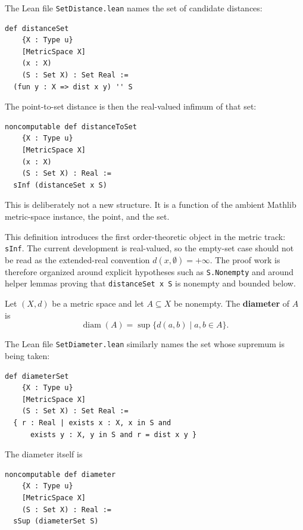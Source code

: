 \begin{remark*}
The Lean file \texttt{SetDistance.lean} names the set of candidate distances:
\begin{verbatim}
def distanceSet
    {X : Type u}
    [MetricSpace X]
    (x : X)
    (S : Set X) : Set Real :=
  (fun y : X => dist x y) '' S
\end{verbatim}
The point-to-set distance is then the real-valued infimum of that set:
\begin{verbatim}
noncomputable def distanceToSet
    {X : Type u}
    [MetricSpace X]
    (x : X)
    (S : Set X) : Real :=
  sInf (distanceSet x S)
\end{verbatim}
This is deliberately not a new structure. It is a function of the ambient
Mathlib metric-space instance, the point, and the set.
\end{remark*}

\begin{remark*}
This definition introduces the first order-theoretic object in the metric
track: \texttt{sInf}. The current development is real-valued, so the empty-set
case should not be read as the extended-real convention
\(d(x,\emptyset)=+\infty\). The proof work is therefore
organized around explicit hypotheses such as \texttt{S.Nonempty} and around
helper lemmas proving that \texttt{distanceSet x S} is nonempty and bounded
below.
\end{remark*}

\begin{remark*}
\begin{definition*}
Let $(X,d)$ be a metric space and let $A\subseteq X$ be nonempty. The
\textbf{diameter} of \(A\) is
\[
  \operatorname{diam}(A)
  =
  \sup\{d(a,b)\mid a,b\in A\}.
\]
\end{definition*}
\end{remark*}

\begin{remark*}
The Lean file \texttt{SetDiameter.lean} similarly names the set whose
supremum is being taken:
\begin{verbatim}
def diameterSet
    {X : Type u}
    [MetricSpace X]
    (S : Set X) : Set Real :=
  { r : Real | exists x : X, x in S and
      exists y : X, y in S and r = dist x y }
\end{verbatim}
The diameter itself is
\begin{verbatim}
noncomputable def diameter
    {X : Type u}
    [MetricSpace X]
    (S : Set X) : Real :=
  sSup (diameterSet S)
\end{verbatim}
\end{remark*}

